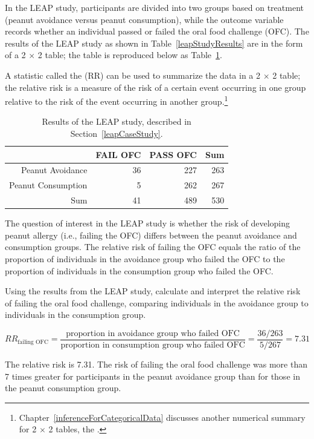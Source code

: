 In the LEAP study, participants are divided into two groups based on treatment (peanut avoidance versus peanut consumption), while the outcome variable records whether an individual passed or failed the oral food challenge (OFC). The results of the LEAP study as shown in Table~\ref{leapStudyResults} are in the form of a 2 $\times$ 2 table; the table is reproduced below as Table~\ref{leapStudyResultsRR}.

A statistic called the  (RR) can be used to summarize the data in a 2 $\times$ 2 table; the relative risk is a measure of the risk of a certain event occurring in one group relative to the risk of the event occurring in another group.\footnote{Chapter~\ref{inferenceForCategoricalData} discusses another numerical summary for 2 $\times$ 2 tables, the .}  


\begin{table}[ht]
	\centering
	\begin{tabular}{rrrr}
		\hline
		& FAIL OFC & PASS OFC & Sum \\ 
		\hline
		Peanut Avoidance & 36 & 227 & 263 \\ 
		Peanut Consumption & 5 & 262 & 267 \\ 
		Sum & 41 & 489 & 530 \\ 
		\hline
	\end{tabular}
	\caption{Results of the LEAP study, described in Section~\ref{leapCaseStudy}.}
	\label{leapStudyResultsRR}
\end{table}

The question of interest in the LEAP study is whether the risk of developing peanut allergy (i.e., failing the OFC) differs between the peanut avoidance and consumption groups. The relative risk of failing the OFC equals the ratio of the proportion of individuals in the avoidance group who failed the OFC to the proportion of individuals in the consumption group who failed the OFC.

\begin{example}{Using the results from the LEAP study, calculate and interpret the relative risk of failing the oral food challenge, comparing individuals in the avoidance group to individuals in the consumption group.}
	
\[RR_{\textrm{failing OFC}} = \dfrac{\textrm{proportion in avoidance group who failed OFC}}{\textrm{proportion in consumption group who failed OFC}} = \dfrac{36/263}{5/267} = 7.31 \]

The relative risk is 7.31. The risk of failing the oral food challenge was more than 7 times greater for participants in the peanut avoidance group than for those in the peanut consumption group.
	
\end{example}

